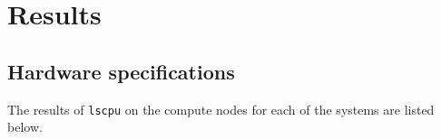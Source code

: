 




\chapter{Results}
\label{ch:results-appendix}

\section{Hardware specifications}
\label{sec:hardware-specifications}

The results of \texttt{lscpu} on the compute nodes for each of the systems are listed below.

